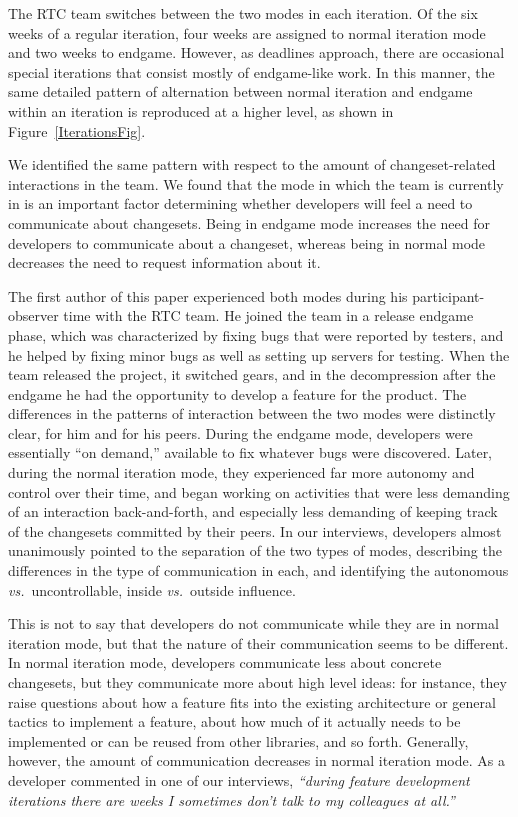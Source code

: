 The RTC team switches between the two modes in each iteration. Of the six weeks of a regular iteration, four weeks are assigned to normal iteration mode and two weeks to endgame. However, as deadlines approach, there are occasional special iterations that consist mostly of endgame-like work. In this manner, the same detailed pattern of alternation between normal iteration and endgame within an iteration is reproduced at a higher level, as shown in Figure~\ref{IterationsFig}.

We identified the same pattern with respect to the amount of changeset-related interactions in the team. We found that the mode in which the team is currently in is an important factor determining whether developers will feel a need to communicate about changesets. Being in endgame mode increases the need for developers to communicate about a changeset, whereas being in normal mode decreases the need to request information about it.

The first author of this paper experienced both modes during his participant-observer time with the RTC team. He joined the team in a release endgame phase, which was characterized by fixing bugs that were reported by testers, and he helped by fixing minor bugs as well as setting up servers for testing. When the team released the project, it switched gears, and in the decompression after the endgame he had the opportunity to develop a feature for the product. The differences in the patterns of interaction between the two modes were distinctly clear, for him and for his peers. During the endgame mode, developers were essentially ``on demand,'' available to fix whatever bugs were discovered. Later, during the normal iteration mode, they experienced far more autonomy and control over their time, and began working on activities that were less demanding of an interaction back-and-forth, and especially less demanding of keeping track of the changesets committed by their peers. In our interviews, developers almost unanimously pointed to the separation of the two types of modes, describing the differences in the type of communication in each, and identifying the autonomous \emph{vs.}~uncontrollable, inside \emph{vs.}~outside influence.

This is not to say that developers do not communicate while they are in normal iteration  mode, but that the nature of their communication seems to be different. In normal iteration mode, developers communicate less about concrete changesets, but they communicate more about high level ideas: for instance, they raise questions about how a feature fits into the existing architecture or general tactics to implement a feature, about how much of it actually needs to be implemented or can be reused from other libraries, and so forth. Generally, however, the amount of communication decreases in normal iteration mode. As a developer commented in one of our interviews, \emph{``during feature development iterations there are weeks I sometimes don't talk to my colleagues at all.''} 

